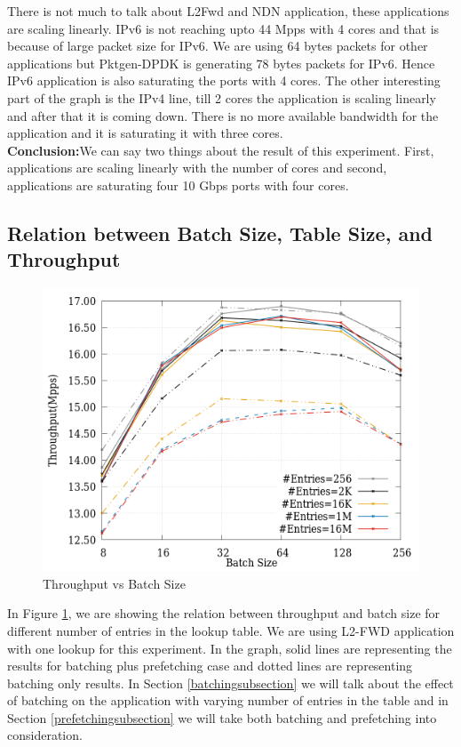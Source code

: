 There is not much to talk about L2Fwd and NDN application, these applications are scaling linearly. IPv6 is not reaching upto 44 Mpps with 4 cores and that is because of large packet size for IPv6. We are using 64 bytes packets for other applications but Pktgen-DPDK is generating 78 bytes packets for IPv6. Hence IPv6 application is also saturating the ports with 4 cores. The other interesting part of the graph is the IPv4 line, till 2 cores the application is scaling linearly and after that it is coming down. There is no more available bandwidth for the application and it is saturating it with three cores. 
\\
\textbf{Conclusion:}We can say two things about the result of this experiment. First, applications are scaling linearly with the number of cores and second, applications are saturating four 10 Gbps ports with four cores.

\subsection{Relation between Batch Size, Table Size, and Throughput}
\label{batchvstable}
\begin{figure}[ht]
\includegraphics[width = \linewidth]{Figures/TableSizeVsbatchSize.png}
\caption{Throughput vs Batch Size}
\label{tablesize}
\end{figure}
In Figure \ref{tablesize}, we are showing the relation between throughput and batch size for different number of entries in the lookup table. We are using L2-FWD application with one lookup for this experiment. In the graph, solid lines are representing the results for batching plus prefetching case and dotted lines are representing batching only results. In Section \ref{batchingsubsection} we will talk about the effect of batching on the application with varying number of entries in the table and in Section \ref{prefetchingsubsection} we will take both batching and prefetching into consideration.

